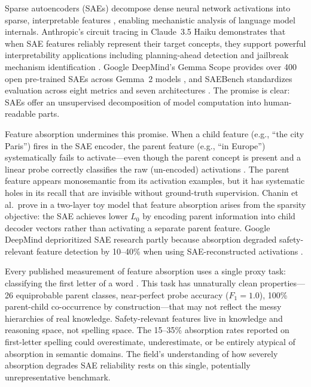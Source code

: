 \documentclass{article}
\begin{document}
Sparse autoencoders (SAEs) decompose dense neural network activations into sparse, interpretable features \citep{cunningham2024sparse, bricken2023monosemanticity}, enabling mechanistic analysis of language model internals. Anthropic's circuit tracing in Claude~3.5 Haiku demonstrates that when SAE features reliably represent their target concepts, they support powerful interpretability applications including planning-ahead detection and jailbreak mechanism identification \citep{lindsey2025circuit}. Google DeepMind's Gemma Scope provides over 400 open pre-trained SAEs across Gemma~2 models \citep{lieberum2024gemma}, and SAEBench standardizes evaluation across eight metrics and seven architectures \citep{karvonen2025saebench}. The promise is clear: SAEs offer an unsupervised decomposition of model computation into human-readable parts.

Feature absorption undermines this promise. When a child feature (e.g., ``the city Paris'') fires in the SAE encoder, the parent feature (e.g., ``in Europe'') systematically fails to activate---even though the parent concept is present and a linear probe correctly classifies the raw (un-encoded) activations \citep{chanin2024absorption}. The parent feature appears monosemantic from its activation examples, but it has systematic holes in its recall that are invisible without ground-truth supervision. Chanin et al.\ prove in a two-layer toy model that feature absorption arises from the sparsity objective: the SAE achieves lower $L_0$ by encoding parent information into child decoder vectors rather than activating a separate parent feature. Google DeepMind deprioritized SAE research partly because absorption degraded safety-relevant feature detection by 10--40\% when using SAE-reconstructed activations \citep{smith2025deprioritize}.

Every published measurement of feature absorption uses a single proxy task: classifying the first letter of a word \citep{chanin2024absorption, karvonen2025saebench}. This task has unnaturally clean properties---26 equiprobable parent classes, near-perfect probe accuracy ($F_1 = 1.0$), 100\% parent-child co-occurrence by construction---that may not reflect the messy hierarchies of real knowledge. Safety-relevant features live in knowledge and reasoning space, not spelling space. The 15--35\% absorption rates reported on first-letter spelling could overestimate, underestimate, or be entirely atypical of absorption in semantic domains. The field's understanding of how severely absorption degrades SAE reliability rests on this single, potentially unrepresentative benchmark.
\end{document}
